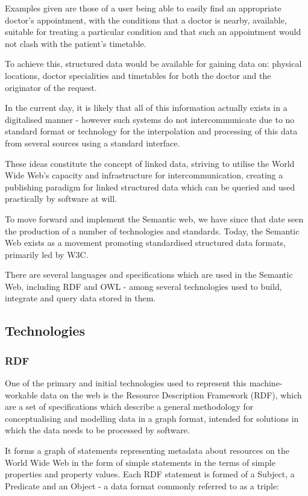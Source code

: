 \documentclass{article}
\begin{document}
Examples given are those of a user being able to easily find an appropriate
doctor's appointment, with the conditions that a doctor is nearby, available, 
suitable for treating a particular condition and that such an appointment would
not clash with the patient's timetable.

To achieve this, structured data would be available for gaining data on:
physical locations, doctor specialities and timetables for both the doctor and
the originator of the request. 

In the current day, it is likely that all of this information actually exists in
a digitalised manner - however such systems do not intercommunicate due to no
standard format or technology for the interpolation and processing of this data
from several sources using a standard interface. 

These ideas constitute the concept of linked data, striving to utilise the World 
Wide Web's capacity and infrastructure for intercommunication, creating a 
publishing paradigm for linked structured data\cite{linkdata} which can be
queried and used practically by software at will.

To move forward and implement the Semantic web, we have since that date seen the
production of a number of technologies and standards. Today, the
Semantic Web exists as a movement promoting standardised structured data
formats, primarily led by W3C.\cite{revisited}

There are several languages and specifications which are used in the Semantic
Web, including RDF and OWL - among several technologies used to build, integrate
and query data stored in them.

\subsection{Technologies}

\subsubsection{RDF}

One of the primary and initial technologies used to represent this machine-workable data on
the web is the Resource Description Framework (RDF)\cite{rdf}, which are a set of
specifications which describe a general methodology for conceptualising and
modelling data in a graph format, intended for solutions in which the data needs to 
be processed by software.

It forms a graph of statements representing metadata about resources on the
World Wide Web in the form of simple statements in the terms of simple
properties and property values. Each RDF statement is formed of a Subject, a
Predicate and an Object - a data format commonly referred to as a triple:
\end{document}
